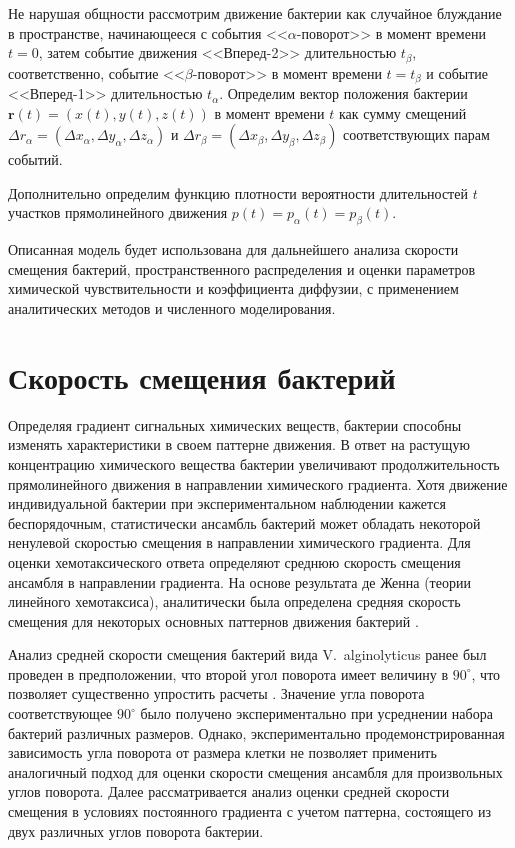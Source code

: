 Не нарушая общности рассмотрим движение бактерии как случайное блуждание в пространстве, начинающееся с события <<$\alpha$-поворот>> в момент времени $t=0$, затем событие движения <<Вперед-2>> длительностью $t_{\beta}$, соответственно, событие <<$\beta$-поворот>> в момент времени $t=t_{\beta}$ и событие <<Вперед-1>> длительностью $t_{\alpha}$. Определим вектор положения бактерии $\textbf{r}(t)=(x(t),y(t),z(t))$ в момент времени $t$ как сумму смещений $\Delta r_{\alpha}=(\Delta x_{\alpha},\Delta y_{\alpha},\Delta z_{\alpha})$ и $\Delta r_{\beta}=(\Delta x_{\beta},\Delta y_{\beta},\Delta z_{\beta})$ соответствующих парам событий. 

Дополнительно определим функцию плотности вероятности длительностей $t$ участков прямолинейного движения $p(t)=p_{\alpha}(t)=p_{\beta}(t)$. 

Описанная модель будет использована для дальнейшего анализа скорости смещения бактерий, пространственного распределения и оценки параметров химической чувствительности и коэффициента диффузии, с применением аналитических методов и численного моделирования. 

\section{Скорость смещения бактерий}\label{sec:ch2/sec3}

Определяя градиент сигнальных химических веществ, бактерии способны изменять характеристики в своем паттерне движения. В ответ на растущую концентрацию химического вещества бактерии увеличивают продолжительность прямолинейного движения в направлении химического градиента. Хотя движение индивидуальной бактерии при экспериментальном наблюдении кажется беспорядочным, статистически ансамбль бактерий может обладать некоторой ненулевой скоростью смещения в направлении химического градиента. Для оценки хемотаксического ответа определяют среднюю скорость смещения ансамбля в направлении градиента. На основе результата де Женна (теории линейного хемотаксиса), аналитически была определена средняя скорость смещения для некоторых основных паттернов движения бактерий \cite{taktikos_how_2013,de_gennes_chemotaxis_2004,locsei_persistence_2007}. 

Анализ средней скорости смещения бактерий вида V.~alginolyticus ранее был проведен в предположении, что второй угол поворота имеет величину в $90^\circ$, что позволяет существенно упростить расчеты \cite{taktikos_how_2013}. Значение угла поворота соответствующее $90^\circ$ было получено экспериментально при усреднении набора бактерий различных размеров. Однако, экспериментально продемонстрированная зависимость угла поворота от размера клетки \cite{taute_high-throughput_2015} не позволяет применить аналогичный подход для оценки скорости смещения ансамбля для произвольных углов поворота. Далее рассматривается анализ оценки средней скорости смещения в условиях постоянного градиента с учетом паттерна, состоящего из двух различных углов поворота бактерии.

